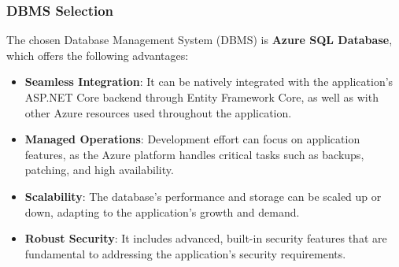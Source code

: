 \subsubsection{DBMS Selection}

The chosen Database Management System (DBMS) is \textbf{Azure SQL Database}, which offers the following advantages:

\begin{itemize} [leftmargin=0.75cm, noitemsep, label=$\bullet$]

    \item \textbf{Seamless Integration}: It can be natively integrated with the application's ASP.NET Core backend through Entity Framework Core, as well as with other Azure resources used throughout the application.

    \item \textbf{Managed Operations}: Development effort can focus on application features, as the Azure platform handles critical tasks such as backups, patching, and high availability.

    \item \textbf{Scalability}: The database's performance and storage can be scaled up or down, adapting to the application's growth and demand.

    \item \textbf{Robust Security}: It includes advanced, built-in security features that are fundamental to addressing the application's security requirements.

\end{itemize}
